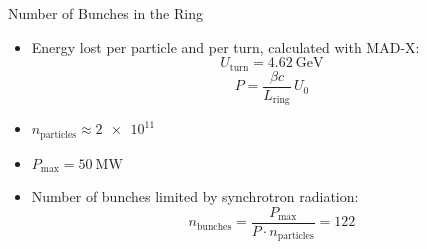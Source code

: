 \documentclass{beamer}
\begin{document}
\begin{frame}[t,fragile]{Number of Bunches in the Ring}
\begin{itemize}
   \item Energy lost per particle and per turn, calculated with MAD-X:
      \begin{equation*}
         U_\text{turn}= \SI{4.62}{\GeV}
      \end{equation*}
\begin{equation*}
   P=\frac{\beta c}{L_{\textrm{ring}}}\,U_0
\end{equation*}
   \item $n_\text{particles} \approx \num{2e11}$
   \item $P_\text{max} = \SI{50}{\mega\watt}$
   \item Number of bunches limited by synchrotron radiation:
\begin{equation*}
n_\text{bunches} = \frac{P_\text{max}}{P\cdot n_\text{particles}} = 122
\end{equation*}
\end{itemize}
\end{frame}
\end{document}
